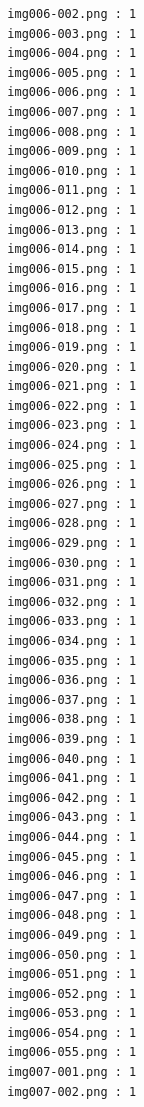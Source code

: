 \documentclass[12pt,a4paper]{article}
\begin{document}
\begin{lstlisting}
                     img006-002.png : 1
                     img006-003.png : 1
                     img006-004.png : 1
                     img006-005.png : 1
                     img006-006.png : 1
                     img006-007.png : 1
                     img006-008.png : 1
                     img006-009.png : 1
                     img006-010.png : 1
                     img006-011.png : 1
                     img006-012.png : 1
                     img006-013.png : 1
                     img006-014.png : 1
                     img006-015.png : 1
                     img006-016.png : 1
                     img006-017.png : 1
                     img006-018.png : 1
                     img006-019.png : 1
                     img006-020.png : 1
                     img006-021.png : 1
                     img006-022.png : 1
                     img006-023.png : 1
                     img006-024.png : 1
                     img006-025.png : 1
                     img006-026.png : 1
                     img006-027.png : 1
                     img006-028.png : 1
                     img006-029.png : 1
                     img006-030.png : 1
                     img006-031.png : 1
                     img006-032.png : 1
                     img006-033.png : 1
                     img006-034.png : 1
                     img006-035.png : 1
                     img006-036.png : 1
                     img006-037.png : 1
                     img006-038.png : 1
                     img006-039.png : 1
                     img006-040.png : 1
                     img006-041.png : 1
                     img006-042.png : 1
                     img006-043.png : 1
                     img006-044.png : 1
                     img006-045.png : 1
                     img006-046.png : 1
                     img006-047.png : 1
                     img006-048.png : 1
                     img006-049.png : 1
                     img006-050.png : 1
                     img006-051.png : 1
                     img006-052.png : 1
                     img006-053.png : 1
                     img006-054.png : 1
                     img006-055.png : 1
                     img007-001.png : 1
                     img007-002.png : 1




\end{lstlisting}
\end{document}
